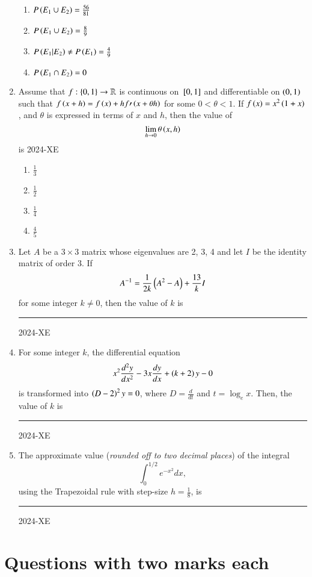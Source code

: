 \documentclass[journal,12pt,onecolumn]{IEEEtran}
\theoremstyle{remark}
\begin{document}
\begin{enumerate}
		\begin{enumerate}
			\item $P\left(E_1 \cup E_2\right) = \frac{56}{81}$
			\item $P\left(E_1 \cup E_2\right)= \frac{8}{9}$
			\item $P\left(E_1 \vert E_2\right) \neq P\left(E_1\right)=\frac{4}{9}$
			\item $P\left(E_1 \cap E_2\right) = 0$
		\end{enumerate}
\newpage
	\item Assume that $f:\left\{0,1\right\} \to \mathbb{R}$ is continuous on ${}\left[0,1\right]$ and differentiable on $\left(0,1\right)$ such that $f\left(x+h\right)=f\left(x\right)+hf\prime \left(x+\theta h\right)$ for some $0< \theta <1$. If $f\left(x\right)=x^2\left(1+x\right)$, and $\theta$ is expressed in terms of $x$ and $h$, then the value of 
		$$ \lim _{h \to 0} \theta \left(x,h\right)$$ is
\hfill{2024-XE}

		\begin{enumerate}
			\item $\frac{1}{3}$
			\item $\frac{1}{2}$
			\item $\frac{1}{4}$
			\item $\frac{4}{5}$
		\end{enumerate}

\item Let $A$ be a $3 \times 3$ matrix whose eigenvalues are 2, 3, 4 and let $I$ be the identity matrix of order 3. If
	$$ A^{-1}=\frac{1}{2k} \left(A^2 -A\right) + \frac{13}{k} I$$
		for some integer $k \neq 0$, then the value of $k$ is \rule{1cm}{0.2pt}
\hfill{2024-XE}


\item For some integer $k$, the differential equation 
		$$ x^2 \frac{d^2 y}{dx^2} -3x\frac{dy}{dx}+\left(k+2\right)y-0$$
	is transformed into $\left(D-2\right)^2 y=0$, where $D=\frac{d}{dt}$ and $t=\log _e x$. Then, the value of $k$ is \rule{1cm}{0.2pt}

 \hfill{2024-XE}


\item The approximate value (\textit{rounded off to two decimal places}) of the integral 
	$$ \int ^{1/2} _{0} e^{-x^2} dx,$$
	using the Trapezoidal rule with step-size $h=\frac{1}{8}$, is \rule{1cm}{0.2pt}
\hfill{2024-XE}


\end{enumerate}

\section{Questions with two marks each}
\end{document}

